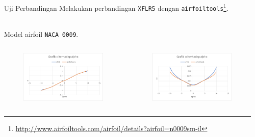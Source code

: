 \begin{frame}{Uji Perbandingan}
  Melakukan perbandingan \texttt{XFLR5} dengan \texttt{airfoiltools}\footnote{\url{http://www.airfoiltools.com/airfoil/details?airfoil=n0009sm-il}}.\\~\\
  \pause

  Model airfoil \texttt{NACA 0009}.
  \pause

  \begin{columns}[t]
    \begin{column}{.33\linewidth}
      \begin{figure}[h]
        \centering
        \includegraphics[width=0.8\linewidth]{statics/plot_naca0009_cla}
      \end{figure}
    \end{column}

    \begin{column}{.33\linewidth}
      \begin{figure}[h]
        \centering
        \includegraphics[width=0.8\linewidth]{statics/plot_naca0009_cda}
      \end{figure}
    \end{column}


\end{columns}
\end{frame}
